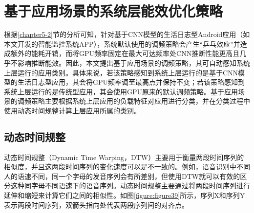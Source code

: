 \section{基于应用场景的系统层能效优化策略}
\label{chapter5-3}

根据\ref{chapter5-2}节的分析可知，针对基于CNN模型的生活日志型Android应用（如本文开发的智能监控系统APP），系统默认使用的调频策略会产生“乒乓效应”并造成额外的能耗开销，而将GPU频率固定在最大可达频率处CNN推断性能更高且几乎不影响推断能效。因此，本文提出基于应用场景的调频策略，其可自动感知系统上层运行的应用类别。具体来说，若该策略感知到系统上层运行的是基于CNN模型的生活日志型应用，其会将GPU频率调至最高点并保持不变；若该策略感知到系统上层运行的是传统型应用，其会使用GPU原来的默认调频策略。基于应用场景的调频策略主要根据系统上层应用的负载特征对应用进行分类，并在分类过程中使用动态时间规整计算上层应用所属的类别。

\subsection{动态时间规整}
\label{chapter5-3-1}
动态时间规整（Dynamic Time Warping，DTW）\cite{muller2007dynamic}主要用于衡量两段时间序列的相似度，并且这两段时间序列的变化速度可以是不一致的。例如，语音识别中不同人的语速不同，同一个字母的发音序列会有所差别，但使用DTW就可以有效的区分这种同字母不同语速下的语音序列。动态时间规整主要通过将两段时间序列进行延伸和缩短来计算它们之间的相似性。如图\ref{figure:figure39}所示，序列X和序列Y表示两段时间序列，双箭头指向处代表两段序列间的对齐点。

